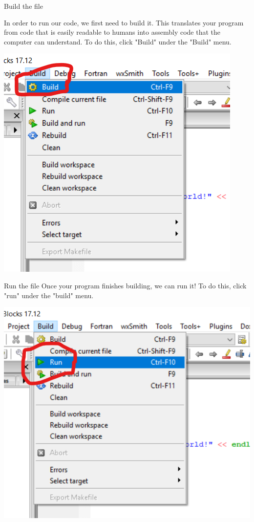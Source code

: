 \documentclass{beamer}
\begin{document}
\begin{frame}{Build the file}

In order to run our code, we first need to \alert{build} it. This translates your program from code that is easily readable to humans into \alert{assembly} code that the computer can understand. To do this, click "Build" under the "Build" menu.

\includegraphics[scale=.6]{codeblockssetup7.png}
    
\end{frame}

\begin{frame}{Run the file}
Once your program finishes building, we can run it! To do this, click "run" under the "build" menu.

\includegraphics[scale=.6]{codeblockssetup8.png}
    
\end{frame}
\end{document}
